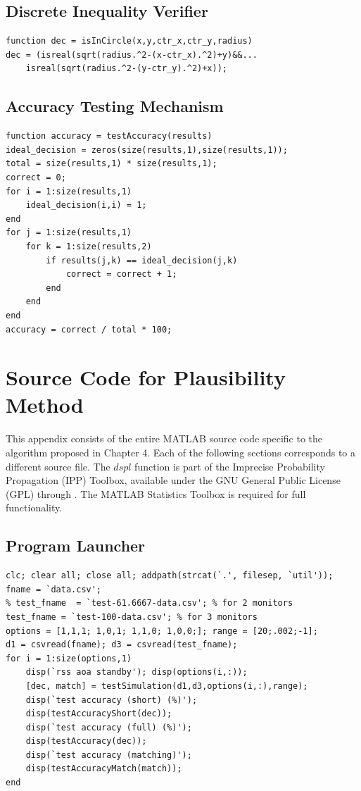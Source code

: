 \documentclass[12pt]{uthesis-v12}  %
\begin{document}
\section{Discrete Inequality Verifier}

\begin{verbatim}
function dec = isInCircle(x,y,ctr_x,ctr_y,radius)
dec = (isreal(sqrt(radius.^2-(x-ctr_x).^2)+y)&&...
    isreal(sqrt(radius.^2-(y-ctr_y).^2)+x));
\end{verbatim}

\section{Accuracy Testing Mechanism}

\begin{verbatim}
function accuracy = testAccuracy(results)
ideal_decision = zeros(size(results,1),size(results,1));
total = size(results,1) * size(results,1); 
correct = 0; 
for i = 1:size(results,1)
    ideal_decision(i,i) = 1;
end
for j = 1:size(results,1)
    for k = 1:size(results,2)
        if results(j,k) == ideal_decision(j,k)
            correct = correct + 1;
        end
    end
end
accuracy = correct / total * 100;
\end{verbatim}

\chapter{Source Code for Plausibility Method}

This appendix consists of the entire MATLAB source code specific to the algorithm proposed in Chapter 4. Each of the following sections corresponds to a different source file. The $dspl$ function is part of the Imprecise Probability Propagation (IPP) Toolbox, available under the GNU General Public License (GPL) through \cite{ipp}. The MATLAB Statistics Toolbox is required for full functionality.

\section{Program Launcher}

\begin{verbatim}
clc; clear all; close all; addpath(strcat(`.', filesep, `util'));
fname = `data.csv';
% test_fname  = `test-61.6667-data.csv'; % for 2 monitors
test_fname = `test-100-data.csv'; % for 3 monitors
options = [1,1,1; 1,0,1; 1,1,0; 1,0,0;]; range = [20;.002;-1];
d1 = csvread(fname); d3 = csvread(test_fname);
for i = 1:size(options,1)
    disp(`rss aoa standby'); disp(options(i,:));
    [dec, match] = testSimulation(d1,d3,options(i,:),range);
    disp(`test accuracy (short) (%)'); 
    disp(testAccuracyShort(dec));
    disp(`test accuracy (full) (%)'); 
    disp(testAccuracy(dec));
    disp(`test accuracy (matching)'); 
    disp(testAccuracyMatch(match));
end
\end{verbatim}
\end{document}
